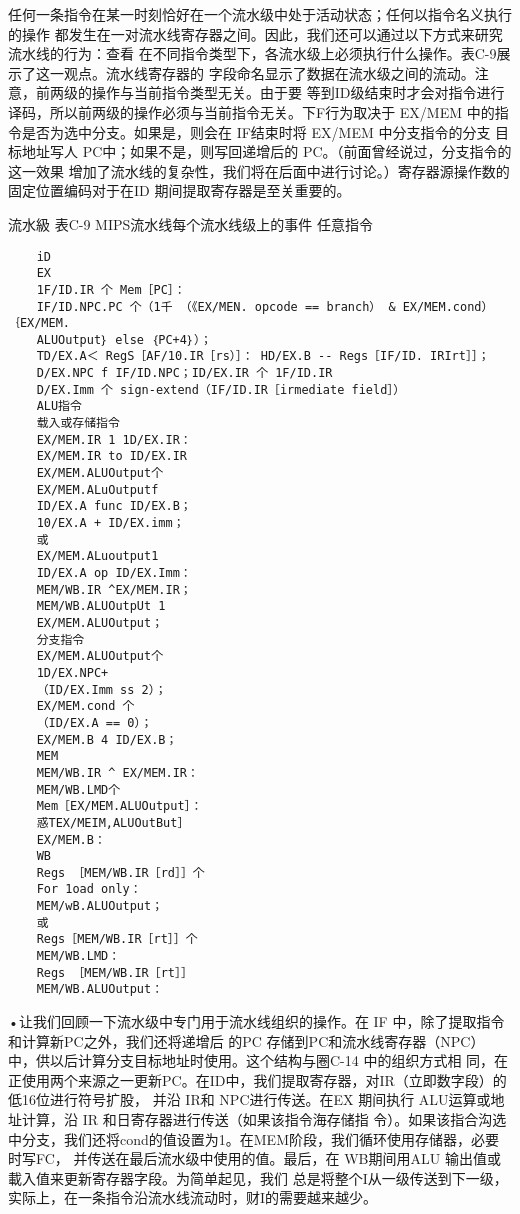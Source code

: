 任何一条指令在某一时刻恰好在一个流水级中处于活动状态；任何以指令名义执行的操作
都发生在一对流水线寄存器之间。因此，我们还可以通过以下方式来研究流水线的行为：查看
在不同指令类型下，各流水级上必须执行什么操作。表C-9展示了这一观点。流水线寄存器的
字段命名显示了数据在流水级之间的流动。注意，前两级的操作与当前指令类型无关。由于要
等到ID级结束时才会对指令进行译码，所以前两级的操作必须与当前指令无关。下F行为取决于
EX/MEM 中的指令是否为选中分支。如果是，则会在 IF结束时将 EX/MEM 中分支指令的分支
目标地址写人 PC中；如果不是，则写回递增后的 PC。（前面曾经说过，分支指令的这一效果
增加了流水线的复杂性，我们将在后面中进行讨论。）寄存器源操作数的固定位置编码对于在ID
期间提取寄存器是至关重要的。

流水級
表C-9 MIPS流水线每个流水线级上的事件
任意指令
\begin{verbatim}
    iD
    EX
    1F/ID.IR 个 Mem［PC］：
    IF/ID.NPC.PC 个（1千 （《EX/MEN. opcode == branch） & EX/MEM.cond） ｛EX/MEM.
    ALUOutput｝ else ｛PC+4｝）；
    TD/EX.A＜ RegS［AF/10.IR［rs）］： HD/EX.B -- Regs［IF/ID. IRIrt］］；
    D/EX.NPC f IF/ID.NPC；ID/EX.IR 个 1F/ID.IR
    D/EX.Imm 个 sign-extend（IF/ID.IR［irmediate field］）
    ALU指令
    载入或存储指令
    EX/MEM.IR 1 1D/EX.IR：
    EX/MEM.IR to ID/EX.IR
    EX/MEM.ALUOutput个
    EX/MEM.ALuOutputf
    ID/EX.A func ID/EX.B；
    10/EX.A + ID/EX.imm；
    或
    EX/MEM.ALuoutput1
    ID/EX.A op ID/EX.Imm：
    MEM/WB.IR ^EX/MEM.IR；
    MEM/WB.ALUOutpUt 1
    EX/MEM.ALUOutput；
    分支指令
    EX/MEM.ALUOutput个
    1D/EX.NPC+
    （ID/EX.Imm ss 2）；
    EX/MEM.cond 个
    （ID/EX.A == 0）；
    EX/MEM.B 4 ID/EX.B；
    MEM
    MEM/WB.IR ^ EX/MEM.IR：
    MEM/WB.LMD个
    Mem［EX/MEM.ALUOutput］：
    惑TEX/MEIM,ALUOutBut］
    EX/MEM.B：
    WB
    Regs ［MEM/WB.IR［rd］］个
    For 1oad only：
    MEM/wB.ALUOutput；
    或
    Regs［MEM/WB.IR［rt］］个
    MEM/WB.LMD：
    Regs ［MEM/WB.IR［rt］］
    MEM/WB.ALUOutput：
\end{verbatim}
•让我们回顾一下流水级中专门用于流水线组织的操作。在 IF 中，除了提取指令和计算新PC之外，我们还将递增后
的PC 存储到PC和流水线寄存器（NPC）中，供以后计算分支目标地址时使用。这个结构与圈C-14 中的组织方式相
同，在正使用两个来源之一更新PC。在ID中，我们提取寄存器，对IR（立即数字段）的低16位进行符号扩股，
并沿 IR和 NPC进行传送。在EX 期间执行 ALU运算或地址计算，沿 IR 和日寄存器进行传送（如果该指令海存储指
令）。如果该指合沟选中分支，我们还将cond的值设置为1。在MEM阶段，我们循环使用存储器，必要时写FC，
并传送在最后流水级中使用的值。最后，在 WB期间用ALU 输出值或載入值来更新寄存器字段。为简单起见，我们
总是将整个I从一级传送到下一级，实际上，在一条指令沿流水线流动时，财I的需要越来越少。


